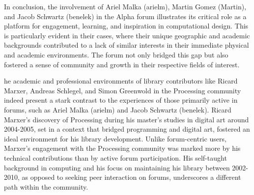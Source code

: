 In conclusion, the involvement of Ariel Malka (arielm), Martin Gomez (Martin), and Jacob Schwartz (benelek) in the Alpha forum illustrates its critical role as a platform for engagement, learning, and inspiration in computational design. This is particularly evident in their cases, where their unique geographic and academic backgrounds contributed to a lack of similar interests in their immediate physical and academic environments. The forum not only bridged this gap but also fostered a sense of community and growth in their respective fields of interest.


he academic and professional environments of library contributors like Ricard Marxer, Andreas Schlegel, and Simon Greenwold in the Processing community indeed present a stark contrast to the experiences of those primarily active in forums, such as Ariel Malka (arielm) and Jacob Schwartz (benelek).
Ricard Marxer's discovery of Processing during his master's studies in digital art around 2004-2005, set in a context that bridged programming and digital art, fostered an ideal environment for his library development. Unlike forum-centric users, Marxer's engagement with the Processing community was marked more by his technical contributions than by active forum participation. His self-taught background in computing and his focus on maintaining his library between 2002-2010, as opposed to seeking peer interaction on forums, underscores a different path within the community​​​​.

